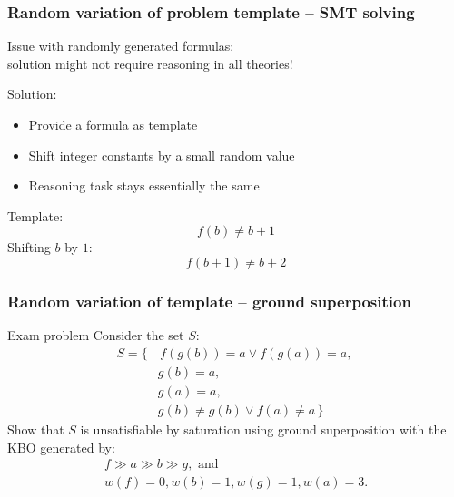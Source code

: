\documentclass[xcolor={table}]{beamer}
\begin{document}
\begin{frame}
    \frametitle{Random variation of problem template -- SMT solving}

    Issue with randomly generated formulas: \\
    solution might not require reasoning in all theories!
    \bigskip
    \pause

    Solution:
    \begin{itemize}
        \item
            Provide a formula as template
        \item
            Shift integer constants by a small random value
        \item
            Reasoning task stays essentially the same
    \end{itemize}

    \begin{example}
        Template:
        \[ f(b) \neq b+1 \]
        Shifting $b$ by $1$:
        \[ f(b+1) \neq b+2 \]
    \end{example}
\end{frame}



\begin{frame}
  \frametitle{Random variation of template -- ground superposition}
    \begin{block}{Exam problem}
      Consider the set $S$:
      \vspace*{-0.5em}
      \begin{align*}
        S = \{& \, f(g(b)) = a \lor f(g(a)) = a,
      ~\\~
      & g(b) = a,
      ~\\~
      & g(a) = a,
      ~\\~
        & g(b)  \neq  g(b) \lor f(a)  \neq  a \,\}
      \end{align*}
      Show that $S$ is unsatisfiable by saturation using ground superposition
      with the KBO generated by:
      \vspace*{-0.5em}
      \begin{gather*}
        f \gg a \gg b \gg g, \text{ and} \\
        w(f) = 0, w(b) = 1, w(g) = 1, w(a) = 3.
      \end{gather*}
    \end{block}

\end{frame}
\end{document}
